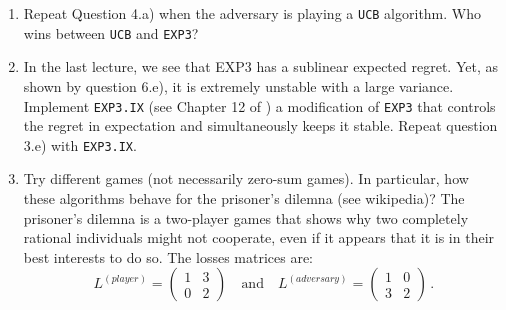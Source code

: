 \begin{enumerate}[resume]
    \item Repeat Question 4.a) when the adversary is playing a \lstinline{UCB} algorithm. Who wins between \lstinline{UCB} and \lstinline{EXP3}?
    
    \begin{solution}

    \end{solution}
    
    
    \item In the last lecture, we see that EXP3 has a sublinear expected regret. Yet, as shown by question 6.e), it is extremely unstable with a large variance. Implement \lstinline{EXP3.IX} (see Chapter 12 of \cite{lattimore2018bandit}) a modification of \lstinline{EXP3} that controls the regret in expectation and simultaneously keeps it stable. 
    Repeat question 3.e) with \lstinline{EXP3.IX}.
    
    \begin{solution}

    \end{solution}
    
    
    \item Try different games (not necessarily zero-sum games). In particular, how these algorithms behave for the prisoner's dilemna (see wikipedia)? The prisoner's dilemna is a two-player games that shows why two completely rational individuals might not cooperate, even if it appears that it is in their best interests to do so. The losses matrices are:
    \begin{equation*}
    L^{(player)} = \begin{pmatrix}
       1 & 3 \\
       0 & 2 
    \end{pmatrix} \quad \text{and} \quad 
    L^{(adversary)} = \begin{pmatrix}
       1 & 0 \\
       3 & 2 
    \end{pmatrix}  \,.
    \end{equation*}
    
    \begin{solution}

    \end{solution}
\end{enumerate}
